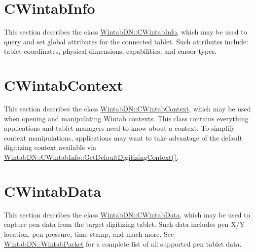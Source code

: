 \hypertarget{page3_cwintabinfo_sec}{}\section{CWintabInfo}\label{page3_cwintabinfo_sec}
This section describes the class \hyperlink{class_wintab_d_n_1_1_c_wintab_info}{WintabDN::CWintabInfo}, which may be used to query and set global attributes for the connected tablet. Such attributes include: tablet coordinates, physical dimensions, capabilities, and cursor types.\hypertarget{page3_cwintabcontext_sec}{}\section{CWintabContext}\label{page3_cwintabcontext_sec}
This section describes the class \hyperlink{class_wintab_d_n_1_1_c_wintab_context}{WintabDN::CWintabContext}, which may be used when opening and manipulating Wintab contexts. This class contains everything applications and tablet managers need to know about a context. To simplify context manipulations, applications may want to take advantage of the default digitizing context available via \hyperlink{class_wintab_d_n_1_1_c_wintab_info_a52434513444ad6db7e7e01ec6c771b88}{WintabDN::CWintabInfo::GetDefaultDigitizingContext()}.\hypertarget{page3_cwintabdata_sec}{}\section{CWintabData}\label{page3_cwintabdata_sec}
This section describes the class \hyperlink{class_wintab_d_n_1_1_c_wintab_data}{WintabDN::CWintabData}, which may be used to capture pen data from the target digitizing tablet. Such data includes pen X/Y location, pen pressure, time stamp, and much more. See \hyperlink{struct_wintab_d_n_1_1_wintab_packet}{WintabDN::WintabPacket} for a complete list of all supported pen tablet data. 
